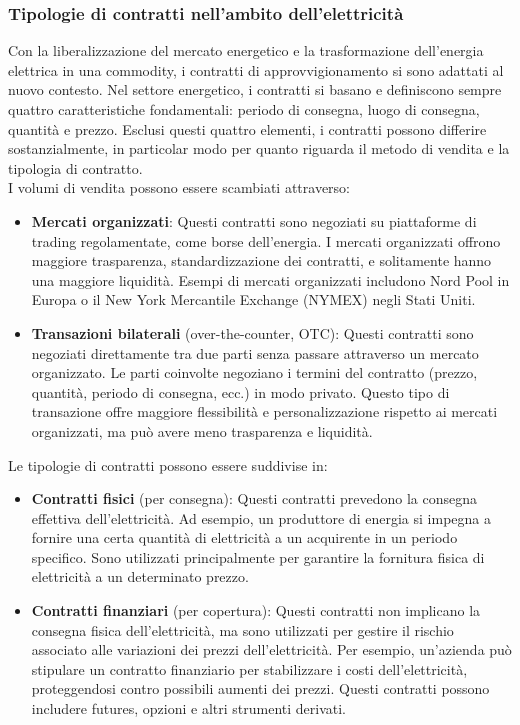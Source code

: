 \documentclass{article}
\begin{document}
\subsubsection{Tipologie di contratti nell'ambito dell'elettricità}
Con la liberalizzazione del mercato energetico e la trasformazione dell'energia elettrica in una commodity, i contratti di approvvigionamento si sono adattati al nuovo contesto. Nel settore energetico, i contratti si basano e definiscono sempre quattro caratteristiche fondamentali: periodo di consegna, luogo di consegna, quantità e prezzo. Esclusi questi quattro elementi, i contratti possono differire sostanzialmente, in particolar modo per quanto riguarda il metodo di vendita e la tipologia di contratto.\cite{Weron2006}\\
I volumi di vendita possono essere scambiati attraverso:
\begin{itemize}
    \item \textbf{Mercati organizzati}: Questi contratti sono negoziati su piattaforme di trading regolamentate, come borse dell'energia. I mercati organizzati offrono maggiore trasparenza, standardizzazione dei contratti, e solitamente hanno una maggiore liquidità. Esempi di mercati organizzati includono Nord Pool in Europa o il New York Mercantile Exchange (NYMEX) negli Stati Uniti.
    \item \textbf{Transazioni bilaterali} (over-the-counter, OTC): Questi contratti sono negoziati direttamente tra due parti senza passare attraverso un mercato organizzato. Le parti coinvolte negoziano i termini del contratto (prezzo, quantità, periodo di consegna, ecc.) in modo privato. Questo tipo di transazione offre maggiore flessibilità e personalizzazione rispetto ai mercati organizzati, ma può avere meno trasparenza e liquidità.\\
\end{itemize}
Le tipologie di contratti possono essere suddivise in:
\begin{itemize}
    \item \textbf{Contratti fisici} (per consegna): Questi contratti prevedono la consegna effettiva dell'elettricità. Ad esempio, un produttore di energia si impegna a fornire una certa quantità di elettricità a un acquirente in un periodo specifico. Sono utilizzati principalmente per garantire la fornitura fisica di elettricità a un determinato prezzo.
    \item \textbf{Contratti finanziari} (per copertura): Questi contratti non implicano la consegna fisica dell'elettricità, ma sono utilizzati per gestire il rischio associato alle variazioni dei prezzi dell'elettricità. Per esempio, un'azienda può stipulare un contratto finanziario per stabilizzare i costi dell'elettricità, proteggendosi contro possibili aumenti dei prezzi. Questi contratti possono includere futures, opzioni e altri strumenti derivati.
\end{itemize}
\end{document}
